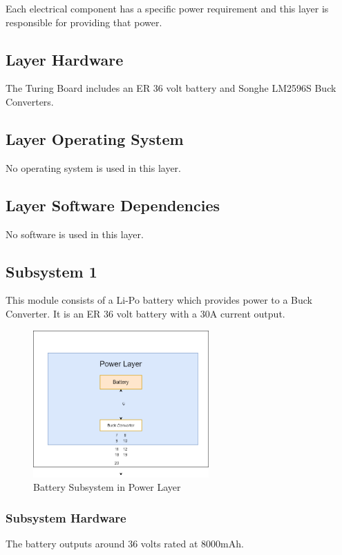 Each electrical component has a specific power requirement and this layer is responsible for providing that power.

\subsection{Layer Hardware}
The Turing Board includes an ER 36 volt battery and Songhe LM2596S Buck Converters. 

\subsection{Layer Operating System}
No operating system is used in this layer.

\subsection{Layer Software Dependencies}
No software is used in this layer.

\subsection{Subsystem 1}
This module consists of a Li-Po battery which provides power to a Buck Converter. It is an ER 36 volt battery with a 30A current output.

\begin{figure}[h!]
	\centering
 	\includegraphics[width=0.60\textwidth]{images/Bat.png} %
 \caption{Battery Subsystem in Power Layer} %
\end{figure}

\subsubsection{Subsystem Hardware}
The battery outputs around 36 volts rated at 8000mAh.

